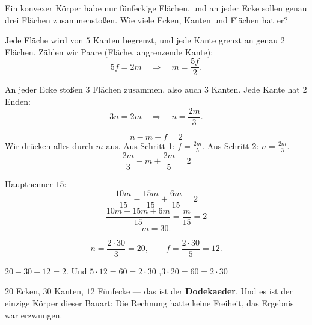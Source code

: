 \begin{aufgabe}
Ein konvexer Körper habe nur fünfeckige Flächen, und an jeder Ecke sollen genau drei Flächen zusammenstoßen. Wie viele Ecken, Kanten und Flächen hat er?

\loesung
{}
Jede Fläche wird von $5$ Kanten begrenzt, und jede Kante grenzt an genau $2$ Flächen. Zählen wir Paare (Fläche, angrenzende Kante):
\[ 5f = 2m \quad\Longrightarrow\quad m = \frac{5f}{2} . \]

An jeder Ecke stoßen $3$ Flächen zusammen, also auch $3$ Kanten. Jede Kante hat $2$ Enden:
\[ 3n = 2m \quad\Longrightarrow\quad n = \frac{2m}{3} . \]

\[ n - m + f = 2 \]
Wir drücken alles durch $m$ aus. Aus Schritt 1: $f = \frac{2m}{5}$. Aus Schritt 2: $n = \frac{2m}{3}$.
\[ \frac{2m}{3} - m + \frac{2m}{5} = 2 \]

Hauptnenner $15$:
\[ \frac{10m}{15} - \frac{15m}{15} + \frac{6m}{15} = 2 \]
\[ \frac{10m - 15m + 6m}{15} = \frac{m}{15} = 2 \]
\[ m = 30 . \]

\[ n = \frac{2 \cdot 30}{3} = 20, \qquad f = \frac{2 \cdot 30}{5} = 12 . \]

$20 - 30 + 12 = 2$. \checkmark\quad Und $5 \cdot 12 = 60 = 2 \cdot 30$ \checkmark,\quad $3 \cdot 20 = 60 = 2 \cdot 30$ \checkmark

$20$ Ecken, $30$ Kanten, $12$ Fünfecke --- das ist der \textbf{Dodekaeder}. Und es ist der einzige Körper dieser Bauart: Die Rechnung hatte keine Freiheit, das Ergebnis war erzwungen.

\begin{center}
\begin{minipage}{0.86\textwidth}
\end{minipage}
\end{center}
\end{aufgabe}

